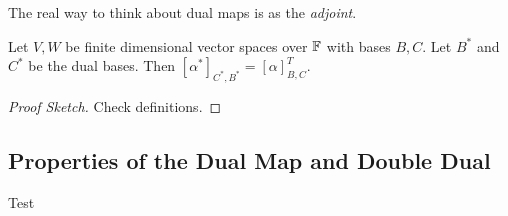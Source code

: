 \documentclass[a4paper]{scrartcl}
\begin{document}
The real way to think about dual maps is as the \emph{adjoint}.

\begin{proposition}
    Let $V, W$ be finite dimensional vector spaces over $\mathbb{F}$ with bases $B, C$. Let $B^*$ and $C^*$ be the dual bases. Then $[\alpha^*]_{C^*, B^*} = [\alpha]_{B, C}^T$.
\end{proposition}
\begin{proof}[Proof Sketch]
    Check definitions.
\end{proof}

\subsection{Properties of the Dual Map and Double Dual}

Test
\end{document}
